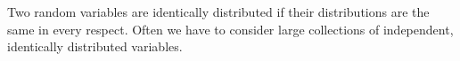 Two random variables are identically distributed if their distributions are the
same in every respect. Often we have to consider large collections of independent,
identically distributed variables.